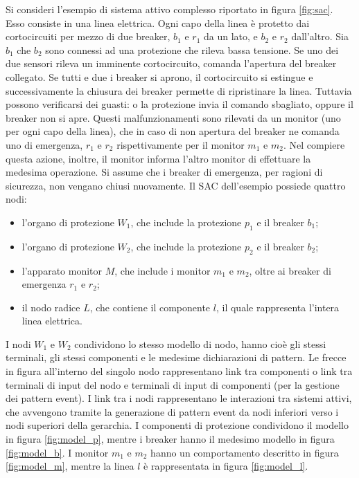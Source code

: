 \begin{ex} \label{ex:ref}
Si consideri l'esempio di sistema attivo complesso riportato in figura \ref{fig:sac}. Esso consiste in una linea elettrica. Ogni capo della linea è protetto dai cortocircuiti per mezzo di due breaker, $b_1$ e $r_1$ da un lato, e $b_2$ e $r_2$ dall'altro. Sia $b_1$ che $b_2$ sono connessi ad una protezione che rileva bassa tensione. Se uno dei due sensori rileva un imminente cortocircuito, comanda l'apertura del breaker collegato. Se tutti e due i breaker si aprono, il cortocircuito si estingue e successivamente la chiusura dei breaker permette di ripristinare la linea. Tuttavia possono verificarsi dei guasti: o la protezione invia il comando sbagliato, oppure il breaker non si apre. Questi malfunzionamenti sono rilevati da un monitor (uno per ogni capo della linea), che in caso di non apertura del breaker ne comanda uno di emergenza, $r_1$ e $r_2$ rispettivamente per il monitor $m_1$ e $m_2$. Nel compiere questa azione, inoltre, il monitor informa l'altro monitor di effettuare la medesima operazione. Si assume che i breaker di emergenza, per ragioni di sicurezza, non vengano chiusi nuovamente. Il SAC dell'esempio possiede quattro nodi:
\begin{itemize}
\item l'organo di protezione $W_1$, che include la protezione $p_1$ e il breaker $b_1$;
\item l'organo di protezione $W_2$, che include la protezione $p_2$ e il breaker $b_2$;
\item l'apparato monitor $M$, che include i monitor $m_1$ e $m_2$, oltre ai breaker di emergenza $r_1$ e $r_2$;
\item il nodo radice $L$, che contiene il componente $l$, il quale rappresenta l'intera linea elettrica.
\end{itemize}
I nodi $W_1$ e $W_2$ condividono lo stesso modello di nodo, hanno cioè gli stessi terminali, gli stessi componenti e le medesime dichiarazioni di pattern.
Le frecce in figura all'interno del singolo nodo rappresentano link tra componenti o link tra terminali di input del nodo e terminali di input di componenti (per la gestione dei pattern event). I link tra i nodi rappresentano le interazioni tra sistemi attivi, che avvengono tramite la generazione di pattern event da nodi inferiori verso i nodi superiori della gerarchia.
I componenti di protezione condividono il modello in figura \ref{fig:model_p}, mentre i breaker hanno il medesimo modello in figura \ref{fig:model_b}. I monitor $m_1$ e $m_2$ hanno un comportamento descritto in figura \ref{fig:model_m}, mentre la linea $l$ è rappresentata in figura \ref{fig:model_l}.

\end{ex}

